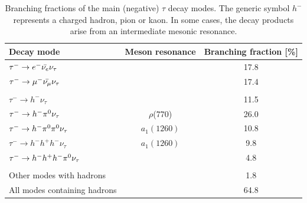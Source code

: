 \begin{table}[]
    \centering
    \caption{Branching fractions of the main (negative) $\tau$ decay modes. The generic symbol $h^-$ represents a charged hadron, pion or kaon. In some cases, the decay products arise from an intermediate mesonic resonance.}
    \begin{tabular}{l c c}
        \hline
         Decay mode & Meson resonance & Branching fraction [\%] \\
         \hline
         $\tau^- \rightarrow e^- \Bar{\nu_e} \nu_\tau$ & & 17.8 \\
         $\tau^- \rightarrow \mu^- \Bar{\nu_\mu} \nu_\tau$ & & 17.4 \\
         & &  \\
         $\tau^- \rightarrow h^- \nu_\tau$ & & 11.5 \\
         $\tau^- \rightarrow h^- \pi^{0} \nu_\tau$ & $\rho$(770) & 26.0 \\
         $\tau^- \rightarrow h^- \pi^{0} \pi^{0} \nu_\tau$ & $a_1(1260)$ & 10.8 \\
         $\tau^- \rightarrow h^- h^+ h^- \nu_\tau$ & $a_1(1260)$ & 9.8 \\
         $\tau^- \rightarrow h^- h^+ h^- \pi^{0} \nu_\tau$ & & 4.8 \\
         & &  \\
         Other modes with hadrons & & 1.8 \\
         All modes containing hadrons & & 64.8 \\
         \hline
    \end{tabular}
    \label{tab:tau_decay_products}
\end{table}
